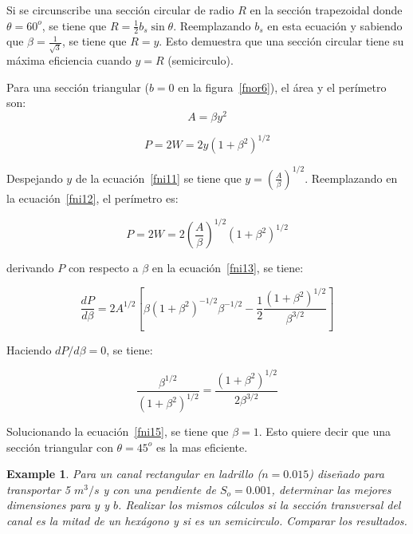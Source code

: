 \documentclass[11pt, oneside]{article}
\newtheorem{exa}{Example}
\begin{document}
Si se circunscribe una secci\'on circular de radio $R$ en la secci\'on trapezoidal donde $\theta=60^o$, se tiene que $R=\frac{1}{2}b_s \sin \theta$. Reemplazando $b_s$ en esta ecuaci\'on y sabiendo que $\beta=\frac{1}{\sqrt{3}}$, se tiene que $R=y$. Esto demuestra que una secci\'on circular tiene su m\'axima eficiencia cuando $y=R$ (semicirculo). 

Para una secci\'on triangular ($b=0$ en la figura~\ref{fnor6}), el \'area y el per\'imetro son:
\begin{equation}
A = \beta y^2
\label{fni11}
\end{equation}

\begin{equation}
P = 2W =  2y \left( 1+\beta^2 \right)^{1/2}
\label{fni12}
\end{equation}

Despejando $y$ de la ecuaci\'on~\ref{fni11} se tiene que $y = \left( \frac{A}{\beta} \right)^{1/2}$. Reemplazando en la ecuaci\'on~\ref{fni12}, el per\'imetro es:

\begin{equation}
P = 2W =  2\left(\frac{A}{\beta}\right)^{1/2} \left( 1+\beta^2 \right)^{1/2}
\label{fni13}
\end{equation}

derivando $P$ con respecto a $\beta$ en la ecuaci\'on~\ref{fni13}, se tiene:

\begin{equation}
\frac{dP}{d\beta} =2A^{1/2}\left[ \beta \left( 1+\beta^2 \right)^{-1/2} \beta^{-1/2} - \frac{1}{2} \frac{\left( 1+\beta^2 \right)^{1/2}}{\beta^{3/2}} \right]
\label{fni14}
\end{equation}

Haciendo $dP/d\beta = 0$, se tiene:

\begin{equation}
\frac{\beta^{1/2}}{\left( 1+\beta^2 \right)^{1/2}} = \frac{\left( 1+\beta^2 \right)^{1/2}}{2 \beta^{3/2}}
\label{fni15}
\end{equation}

Solucionando la ecuaci\'on~\ref{fni15}, se tiene que $\beta=1$. Esto quiere decir que una secci\'on triangular con $\theta=45^o$ es la mas eficiente.

\begin{shaded}
\begin{exa}
Para un canal rectangular en ladrillo ($n=0.015$) dise\~nado para transportar 5 $m^3 /s$ y con una pendiente de $S_o = 0.001$, determinar las mejores dimensiones para $y$ y $b$. Realizar los mismos c\'alculos si la secci\'on transversal del canal es la mitad de un hex\'agono y si es un semicirculo. Comparar los resultados.  
\end{exa}
\end{shaded}
\end{document}

